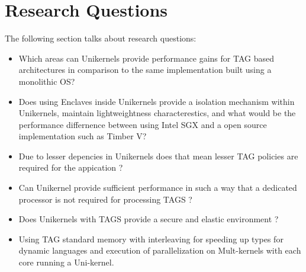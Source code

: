 
\chapter{Research Questions}  %

The following section talks about research questions: 

\begin{itemize}
    \item Which areas can Unikernels provide performance gains for TAG based architectures in comparison to the same implementation built using a monolithic OS? 
    \item Does using Enclaves inside Unikernels provide a isolation mechanism within Unikernels, maintain lightweightness characterestics, and 
    what would be the performance differnence between using Intel SGX and a open source implementation such as Timber V?
    \item Due to lesser depencies in Unikernels does that mean lesser TAG policies are required for the appication ? 
    \item Can Unikernel provide sufficient performance in such a way that a dedicated processor is not required for processing TAGS ?   
    \item Does Unikernels with TAGS provide a secure and elastic environment ? 

    \item Using TAG standard memory with interleaving for speeding up types for dynamic languages and execution of parallelization on Mult-kernels with each core 
          running a Uni-kernel.
\end{itemize}